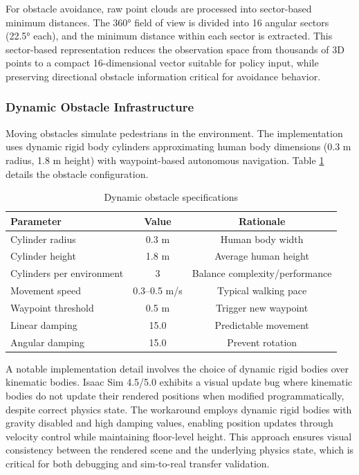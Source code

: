 \documentclass[12pt,a4paper]{article}
\begin{document}
For obstacle avoidance, raw point clouds are processed into sector-based minimum distances. The 360° field of view is divided into 16 angular sectors (22.5° each), and the minimum distance within each sector is extracted. This sector-based representation reduces the observation space from thousands of 3D points to a compact 16-dimensional vector suitable for policy input, while preserving directional obstacle information critical for avoidance behavior.

\subsubsection{Dynamic Obstacle Infrastructure}

Moving obstacles simulate pedestrians in the environment. The implementation uses dynamic rigid body cylinders approximating human body dimensions (0.3 m radius, 1.8 m height) with waypoint-based autonomous navigation. Table \ref{tab:obstacle_specs} details the obstacle configuration.

\begin{table}[htbp]
\centering
\caption{Dynamic obstacle specifications}
\label{tab:obstacle_specs}
\begin{tabular}{lcc}
\toprule
\textbf{Parameter} & \textbf{Value} & \textbf{Rationale} \\
\midrule
Cylinder radius & 0.3 m & Human body width \\
Cylinder height & 1.8 m & Average human height \\
Cylinders per environment & 3 & Balance complexity/performance \\
Movement speed & 0.3--0.5 m/s & Typical walking pace \\
Waypoint threshold & 0.5 m & Trigger new waypoint \\
Linear damping & 15.0 & Predictable movement \\
Angular damping & 15.0 & Prevent rotation \\
\bottomrule
\end{tabular}
\end{table}

A notable implementation detail involves the choice of dynamic rigid bodies over kinematic bodies. Isaac Sim 4.5/5.0 exhibits a visual update bug where kinematic bodies do not update their rendered positions when modified programmatically, despite correct physics state. The workaround employs dynamic rigid bodies with gravity disabled and high damping values, enabling position updates through velocity control while maintaining floor-level height. This approach ensures visual consistency between the rendered scene and the underlying physics state, which is critical for both debugging and sim-to-real transfer validation.
\end{document}
